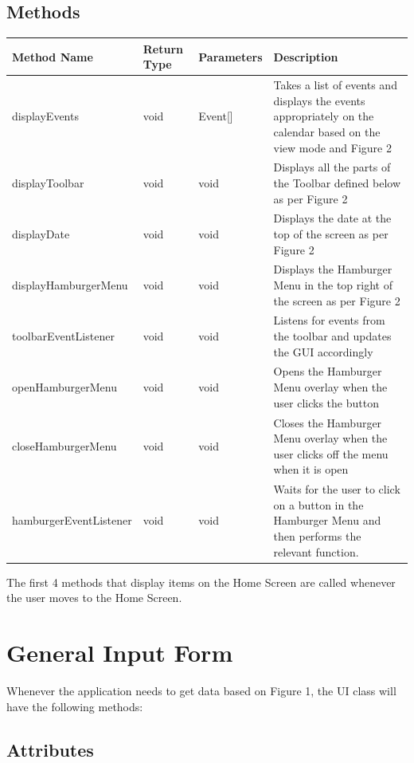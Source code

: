 \documentclass{scrreprt}
\begin{document}
\subsection{Methods}

\begin{center}
\begin{longtable}{ | p{5cm} | p{2cm} | p{3cm} | p{5cm} | }
\hline
\textbf{Method Name} & \textbf{Return Type} & \textbf{Parameters} & \textbf{Description} \\
\hline
displayEvents & void & Event[] & Takes a list of events and displays the events appropriately on the calendar based on the view mode and Figure 2 \\
\hline
displayToolbar & void & void & Displays all the parts of the Toolbar defined below as per Figure 2 \\
\hline
displayDate & void & void & Displays the date at the top of the screen as per Figure 2 \\
\hline
displayHamburgerMenu & void & void & Displays the Hamburger Menu in the top right of the screen as per Figure 2 \\
\hline
toolbarEventListener & void & void & Listens for events from the toolbar and updates the GUI accordingly \\
\hline
openHamburgerMenu & void & void & Opens the Hamburger Menu overlay when the user clicks the button \\
\hline
closeHamburgerMenu & void & void & Closes the Hamburger Menu overlay when the user clicks off the menu when it is open \\
\hline
hamburgerEventListener & void & void & Waits for the user to click on a button in the Hamburger Menu and then performs the relevant function. \\
\hline
\end{longtable}
\end{center}

The first 4 methods that display items on the Home Screen are called whenever the user moves to the Home Screen.

\section{General Input Form}

Whenever the application needs to get data based on Figure 1, the UI class will have the following methods:

\subsection{Attributes}
\end{document}
